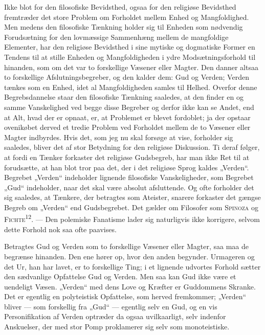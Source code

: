 \documentclass[12pt,a4paper,openany]{book}
\newcommand{\opage}[1]{\marginnote{\footnotesize\textit{[#1]}}}
\begin{document}
Ikke blot for den filosofiske Bevidsthed, ogsaa for den religiøse
Bevidsthed fremtræder det store Problem om Forholdet mellem Enhed og
Mangfoldighed. Men medens den filosofiske Tænkning holder sig til
Enheden som nødvendig Forudsætning for den lovmæssige Sammenhæng mellem
de mangfoldige Elementer, har den religiøse Bevidsthed i sine mytiske og
dogmatiske Former en Tendens til at stille Enheden og Mangfoldigheden i
ydre Modsætningsforhold til hinanden, som om det var to forskellige
Væsener eller Magter. Den danner altsaa to forskellige
Afslutningsbegreber, og den kalder dem: Gud og Verden; Verden tænkes som
en Enhed, idet al Mangfoldigheden samles til Helhed. Overfor denne
Begrebsdannelse staar den filosofiske Tænkning saaledes, at den finder
en og samme Vanskelighed ved begge disse Begreber og derfor ikke kan se
Andet, end at Alt, hvad der er opnaat, er, at Problemet er blevet
fordoblet; ja der opstaar ovenikøbet derved et tredie Problem ved
Forholdet mellem de to Væsener eller Magter indbyrdes. Hvis det, som jeg
nu skal forsøge at vise, forholder sig saaledes, bliver det af stor
Betydning for den religiøse Diskussion. Ti deraf følger, at fordi en
Tænker forkaster det religiøse Gudsbegreb, har man ikke Ret til at
forudsætte, at han
\opage{36}blot tror paa det, der i det religiøse Sprog kaldes „Verden“.
Begrebet „Verden“ indeholder lignende filosofiske Vanskeligheder, som
Begrebet „Gud“ indeholder, naar det skal være absolut afsluttende. Og
ofte forholder det sig saaledes, at Tænkere, der betragtes som Ateister,
snarere forkaster det gængse Begreb om „Verden“ end Gudsbegrebet. Det
gælder om Filosofer som \textsc{Spinoza} og
\textsc{Fichte}\textsuperscript{12}. --- Den polemiske Fanatisme lader
sig naturligvis ikke korrigere, selvom dette Forhold nok saa ofte
paavises.

Betragtes Gud og Verden som to forskellige Væsener eller Magter, saa maa
de begrænse hinanden. Den ene hører op, hvor den anden begynder.
Urmageren og det Ur, han har lavet, er to forskellige Ting; i et
lignende udvortes Forhold sætter den sædvanlige Opfattelse Gud og
Verden. Men saa kan Gud ikke være et uendeligt Væsen. „Verden“ med dens
Love og Kræfter er Guddommens Skranke. Det er egentlig en polyteistisk
Opfattelse, som herved fremkommer; „Verden“ bliver --- som forskellig
fra „Gud“ --- egentlig selv en Gud, og en vis Personifikation af Verden
optræder da ogsaa uvilkaarligt, selv indenfor Anskuelser, der med stor
Pomp proklamerer sig selv som monoteistiske.
\end{document}
